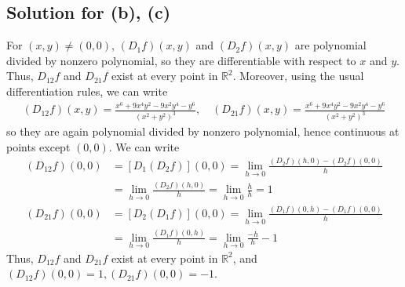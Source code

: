 \documentclass{scrartcl}
\begin{document}
\subsection{Solution for (b), (c)}
For \((x, y) \not = (0, 0)\), \((D_1 f) (x, y)\) and \((D_2 f) (x, y)\) are
polynomial divided by nonzero polynomial, so they are differentiable with
respect to \(x\) and \(y\). Thus, \(D_{12} f\) and \(D_{21} f\) exist at every
point in \(\mathbb{R}^2\). Moreover, using the usual differentiation rules, we
can write
\begin{align*}
  (D_{12} f) (x, y)
  = \frac{x^6 + 9x^4 y^2 - 9x^2 y^4 - y^6}{(x^2 + y^2)^3}, \quad
  (D_{21} f) (x, y)
  = \frac{x^6 + 9x^4 y^2 - 9x^2 y^4 - y^6}{(x^2 + y^2)^3}
\end{align*}
so they are again polynomial divided by nonzero polynomial, hence continuous at
points except \((0, 0)\). We can write
\begin{align*}
  (D_{12} f) (0, 0)
  &= [D_1 (D_2 f)] (0, 0)
  = \lim_{h \to 0} \frac{(D_2 f) (h, 0) - (D_2 f) (0, 0)}{h} \\
  &= \lim_{h \to 0} \frac{(D_2 f) (h, 0)}{h}
  = \lim_{h \to 0} \frac{h}{h}
  = 1 \\
  (D_{21} f) (0, 0)
  &= [D_2 (D_1 f)] (0, 0)
  = \lim_{h \to 0} \frac{(D_1 f) (0, h) - (D_1 f) (0, 0)}{h} \\
  &= \lim_{h \to 0} \frac{(D_1 f) (0, h)}{h}
  = \lim_{h \to 0} \frac{-h}{h}
  -1
\end{align*}
Thus, \(D_{12} f\) and \(D_{21} f\) exist at every point in \(\mathbb{R}^2\),
and \((D_{12} f) (0, 0) = 1, (D_{21} f) (0, 0) = -1\).
\end{document}
